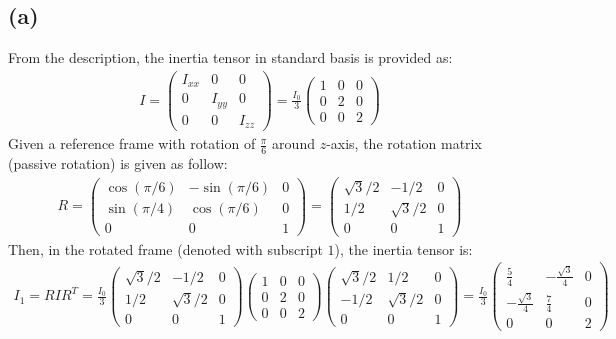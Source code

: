 \documentclass{article}
\begin{document}
\subsection*{(a)}
From the description, the inertia tensor in standard basis is provided as:
\begin{align}
    I = \begin{pmatrix}
        I_{xx}&0&0\\
        0&I_{yy}&0\\
        0&0&I_{zz}
    \end{pmatrix} = \frac{I_0}{3}\begin{pmatrix}
        1&0&0\\
        0&2&0\\
        0&0&2
    \end{pmatrix}
\end{align}
Given a reference frame with rotation of $\frac{\pi}{6}$ around $z$-axis, the rotation matrix (passive rotation) is given as follow:
\begin{align}
    R = \begin{pmatrix}
        \cos(\pi/6)&-\sin(\pi/6)&0\\
        \sin(\pi/4)&\cos(\pi/6)&0\\
        0&0&1
    \end{pmatrix} = \begin{pmatrix}
        \sqrt{3}/2 & -1/2&0\\
        1/2&\sqrt{3}/2&0\\
        0&0&1
    \end{pmatrix}
\end{align}
Then, in the rotated frame (denoted with subscript $1$), the inertia tensor is:
\begin{align}
    I_1 = RIR^T = \frac{I_0}{3}\begin{pmatrix}
        \sqrt{3}/2 & -1/2&0\\
        1/2&\sqrt{3}/2&0\\
        0&0&1
    \end{pmatrix}\begin{pmatrix}
        1&0&0\\0&2&0\\0&0&2
    \end{pmatrix}\begin{pmatrix}
        \sqrt{3}/2 & 1/2&0\\
        -1/2&\sqrt{3}/2&0\\
        0&0&1
    \end{pmatrix} = \frac{I_0}{3}\begin{pmatrix}
        \frac{5}{4} & -\frac{\sqrt{3}}{4} & 0\\
        -\frac{\sqrt{3}}{4} & \frac{7}{4}&0\\
        0&0&2
    \end{pmatrix}
\end{align}
\end{document}

